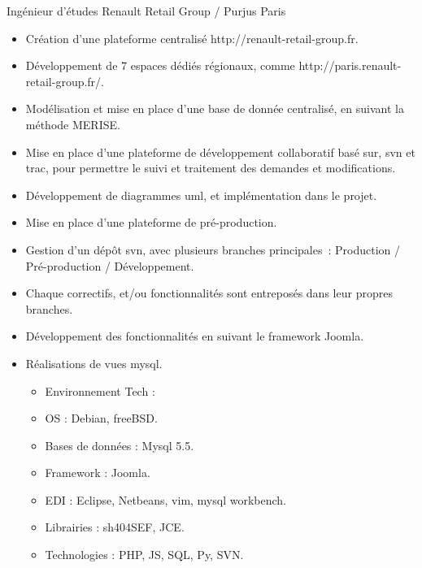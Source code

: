 \documentclass[10pt,a4paper,sans]{moderncv}
\begin{document}
 {Ingénieur d'études} {Renault Retail Group / Purjus}
{Paris}{}{
    \begin{itemize}%
        \item Création d'une plateforme centralisé http://renault-retail-group.fr.
        \item Développement de 7 espaces dédiés régionaux, comme http://paris.renault-retail-group.fr/.
        \item Modélisation et mise en place d'une base de donnée centralisé, en suivant la méthode MERISE.
        \item Mise en place d'une plateforme de développement collaboratif basé sur, svn et trac, pour permettre le suivi et traitement des demandes et modifications.
        \item Développement de diagrammes uml, et implémentation dans le projet.
        \item Mise en place d'une plateforme de pré-production.
        \item Gestion d'un dépôt svn, avec plusieurs branches principales : Production / Pré-production / Développement.
        \item Chaque correctifs, et/ou fonctionnalités sont entreposés dans leur propres branches.
        \item Développement des fonctionnalités en suivant le framework Joomla.
        \item Réalisations de vues mysql.
            \begin{itemize}%
                \item Environnement Tech :
                \item OS : Debian, freeBSD.
                \item Bases de données : Mysql 5.5.
                \item Framework : Joomla.
                \item EDI : Eclipse, Netbeans, vim, mysql workbench.
                \item Librairies : sh404SEF, JCE.
                \item Technologies : PHP, JS, SQL, Py, SVN.
            \end{itemize}
\end{itemize}}
\end{document}
